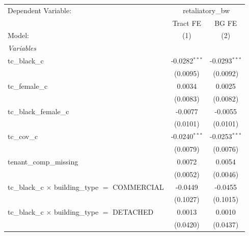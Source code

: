 \par\endgroup
\begingroup
\centering
\begin{tabular}{lcc}
   \tabularnewline \midrule \midrule
   Dependent Variable: & \multicolumn{2}{c}{retaliatory\_bw}\\
                                                                       & Tract FE        & BG FE \\   
   Model:                                                              & (1)             & (2)\\  
   \midrule
   \emph{Variables}\\
   tc\_black\_c                                                        & -0.0282$^{***}$ & -0.0293$^{***}$\\   
                                                                       & (0.0095)        & (0.0092)\\   
   tc\_female\_c                                                       & 0.0034          & 0.0025\\   
                                                                       & (0.0083)        & (0.0082)\\   
   tc\_black\_female\_c                                                & -0.0077         & -0.0055\\   
                                                                       & (0.0101)        & (0.0101)\\   
   tc\_cov\_c                                                          & -0.0240$^{***}$ & -0.0253$^{***}$\\   
                                                                       & (0.0079)        & (0.0076)\\   
   tenant\_comp\_missing                                               & 0.0072          & 0.0054\\   
                                                                       & (0.0052)        & (0.0046)\\   
   tc\_black\_c $\times$ building\_type $=$ COMMERCIAL                 & -0.0449         & -0.0455\\   
                                                                       & (0.1027)        & (0.1015)\\   
   tc\_black\_c $\times$ building\_type $=$ DETACHED                   & 0.0013          & 0.0010\\   
                                                                       & (0.0420)        & (0.0437)\\   

\end{tabular}
